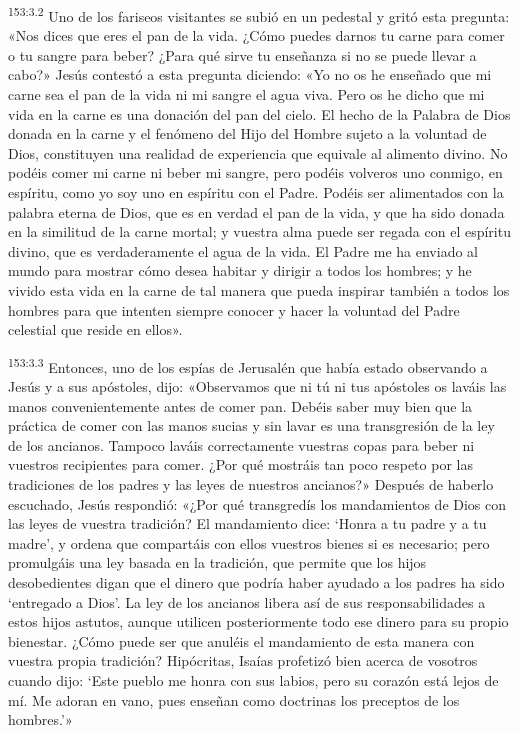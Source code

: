 \par 
\textsuperscript{153:3.2} Uno de los fariseos visitantes se subió en un pedestal y gritó esta pregunta: «Nos dices que eres el pan de la vida. ¿Cómo puedes darnos tu carne para comer o tu sangre para beber? ¿Para qué sirve tu enseñanza si no se puede llevar a cabo?» Jesús contestó a esta pregunta diciendo: «Yo no os he enseñado que mi carne sea el pan de la vida ni mi sangre el agua viva. Pero os he dicho que mi vida en la carne es una donación del pan del cielo. El hecho de la Palabra de Dios donada en la carne y el fenómeno del Hijo del Hombre sujeto a la voluntad de Dios, constituyen una realidad de experiencia que equivale al alimento divino. No podéis comer mi carne ni beber mi sangre, pero podéis volveros uno conmigo, en espíritu, como yo soy uno en espíritu con el Padre. Podéis ser alimentados con la palabra eterna de Dios, que es en verdad el pan de la vida, y que ha sido donada en la similitud de la carne mortal; y vuestra alma puede ser regada con el espíritu divino, que es verdaderamente el agua de la vida. El Padre me ha enviado al mundo para mostrar cómo desea habitar y dirigir a todos los hombres; y he vivido esta vida en la carne de tal manera que pueda inspirar también a todos los hombres para que intenten siempre conocer y hacer la voluntad del Padre celestial que reside en ellos».

\par 
\textsuperscript{153:3.3} Entonces, uno de los espías de Jerusalén que había estado observando a Jesús y a sus apóstoles, dijo: «Observamos que ni tú ni tus apóstoles os laváis las manos convenientemente antes de comer pan. Debéis saber muy bien que la práctica de comer con las manos sucias y sin lavar es una transgresión de la ley de los ancianos. Tampoco laváis correctamente vuestras copas para beber ni vuestros recipientes para comer. ¿Por qué mostráis tan poco respeto por las tradiciones de los padres y las leyes de nuestros ancianos?» Después de haberlo escuchado, Jesús respondió: «¿Por qué transgredís los mandamientos de Dios con las leyes de vuestra tradición? El mandamiento dice: `Honra a tu padre y a tu madre', y ordena que compartáis con ellos vuestros bienes si es necesario; pero promulgáis una ley basada en la tradición, que permite que los hijos desobedientes digan que el dinero que podría haber ayudado a los padres ha sido `entregado a Dios'. La ley de los ancianos libera así de sus responsabilidades a estos hijos astutos, aunque utilicen posteriormente todo ese dinero para su propio bienestar. ¿Cómo puede ser que anuléis el mandamiento de esta manera con vuestra propia tradición? Hipócritas, Isaías profetizó bien acerca de vosotros cuando dijo: `Este pueblo me honra con sus labios, pero su corazón está lejos de mí. Me adoran en vano, pues enseñan como doctrinas los preceptos de los hombres.'»

